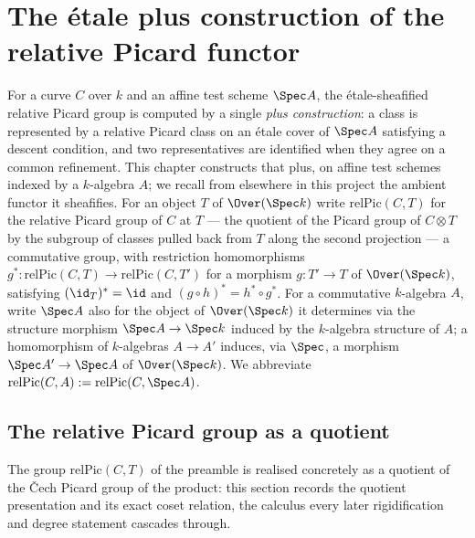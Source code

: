 \chapter{The \'etale plus construction of the relative Picard functor}
\label{chap:PicardEtale}

For a curve \(C\) over \(k\) and an affine test scheme \(\Spec A\), the \'etale-sheafified
relative Picard group is computed by a single \emph{plus construction}: a class is represented
by a relative Picard class on an \'etale cover of \(\Spec A\) satisfying a descent condition,
and two representatives are identified when they agree on a common refinement. This chapter
constructs that plus, on affine test schemes indexed by a \(k\)-algebra \(A\); we recall from
elsewhere in this project the ambient functor it sheafifies. For an object \(T\) of
\(\Over(\Spec k)\) write \(\mathrm{relPic}(C,T)\) for the relative Picard group of \(C\) at
\(T\) --- the quotient of the Picard group of \(C \otimes T\) by the subgroup of classes pulled
back from \(T\) along the second projection --- a commutative group, with restriction
homomorphisms \(g^{*} \colon \mathrm{relPic}(C,T) \to \mathrm{relPic}(C,T')\) for a morphism
\(g \colon T' \to T\) of \(\Over(\Spec k)\), satisfying \((\id_T)^{*} = \id\) and
\((g \circ h)^{*} = h^{*} \circ g^{*}\). For a commutative \(k\)-algebra \(A\), write \(\Spec A\)
also for the object of \(\Over(\Spec k)\) it determines via the structure morphism
\(\Spec A \to \Spec k\) induced by the \(k\)-algebra structure of \(A\); a homomorphism of
\(k\)-algebras \(A \to A'\) induces, via \(\Spec\), a morphism \(\Spec A' \to \Spec A\) of
\(\Over(\Spec k)\). We abbreviate \(\mathrm{relPic}(C,A) := \mathrm{relPic}(C,\Spec A)\).

\section{The relative Picard group as a quotient}

The group \(\mathrm{relPic}(C,T)\) of the preamble is realised concretely as a quotient of
the \v Cech Picard group of the product: this section records the quotient presentation and
its exact coset relation, the calculus every later rigidification and degree statement
cascades through.

